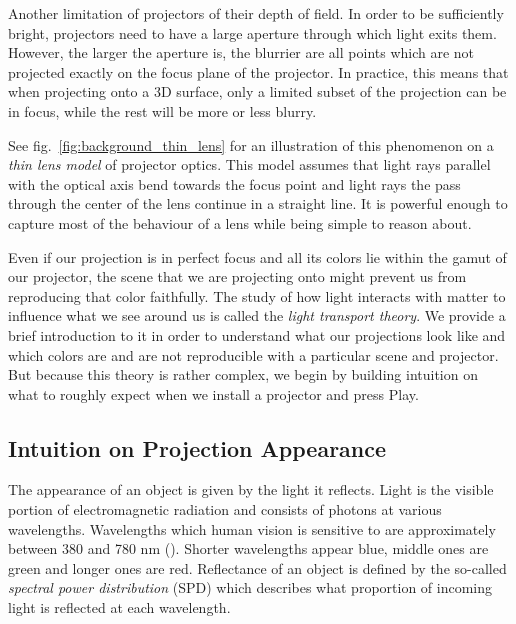 Another limitation of projectors of their depth of field. In order to be sufficiently bright, projectors need to have a large aperture through which light exits them. However, the larger the aperture is, the blurrier are all points which are not projected exactly on the focus plane of the projector. In practice, this means that when projecting onto a 3D surface, only a limited subset of the projection can be in focus, while the rest will be more or less blurry.

See fig.~\ref{fig:background_thin_lens} for an illustration of this phenomenon on a \textit{thin lens model} of projector optics. This model assumes that light rays parallel with the optical axis bend towards the focus point and light rays the pass through the center of the lens continue in a straight line. It is powerful enough to capture most of the behaviour of a lens while being simple to reason about.

Even if our projection is in perfect focus and all its colors lie within the gamut of our projector, the scene that we are projecting onto might prevent us from reproducing that color faithfully. The study of how light interacts with matter to influence what we see around us is called the \textit{light transport theory}. We provide a brief introduction to it in order to understand what our projections look like and which colors are and are not reproducible with a particular scene and projector. But because this theory is rather complex, we begin by building intuition on what to roughly expect when we install a projector and press Play.

\subsection{Intuition on Projection Appearance}
\label{section:background-projection_mapping-projection_intuition}

The appearance of an object is given by the light it reflects. Light is the visible portion of electromagnetic radiation and consists of photons at various wavelengths. Wavelengths which human vision is sensitive to are approximately between 380 and 780 nm (\citet{PBRT3e}). Shorter wavelengths appear blue, middle ones are green and longer ones are red. Reflectance of an object is defined by the so-called \textit{spectral power distribution} (SPD) which describes what proportion of incoming light is reflected at each wavelength.

